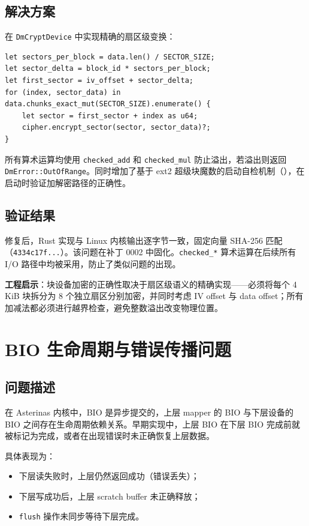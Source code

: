 \subsection{解决方案}

在 \texttt{DmCryptDevice} 中实现精确的扇区级变换：

\begin{verbatim}
let sectors_per_block = data.len() / SECTOR_SIZE;
let sector_delta = block_id * sectors_per_block;
let first_sector = iv_offset + sector_delta;
for (index, sector_data) in data.chunks_exact_mut(SECTOR_SIZE).enumerate() {
    let sector = first_sector + index as u64;
    cipher.encrypt_sector(sector, sector_data)?;
}
\end{verbatim}

所有算术运算均使用 \texttt{checked\_add} 和 \texttt{checked\_mul} 防止溢出，若溢出则返回 \texttt{DmError::OutOfRange}。同时增加了基于 ext2 超级块魔数的启动自检机制（\texttt{}），在启动时验证加解密路径的正确性。

\subsection{验证结果}

修复后，Rust 实现与 Linux 内核输出逐字节一致，固定向量 SHA-256 匹配（\texttt{4334c17f...}）。该问题在补丁 0002 中固化。\texttt{checked\_*} 算术运算在后续所有 I/O 路径中均被采用，防止了类似问题的出现。

\textbf{工程启示}：块设备加密的正确性取决于扇区级语义的精确实现——必须将每个 4 KiB 块拆分为 8 个独立扇区分别加密，并同时考虑 IV offset 与 data offset；所有加减法都必须进行越界检查，避免整数溢出改变物理位置。

\section{BIO 生命周期与错误传播问题}

\subsection{问题描述}

在 Asterinas 内核中，BIO 是异步提交的，上层 mapper 的 BIO 与下层设备的 BIO 之间存在生命周期依赖关系。早期实现中，上层 BIO 在下层 BIO 完成前就被标记为完成，或者在出现错误时未正确恢复上层数据。

具体表现为：
\begin{itemize}
    \item 下层读失败时，上层仍然返回成功（错误丢失）；
    \item 下层写成功后，上层 scratch buffer 未正确释放；
    \item \texttt{flush} 操作未同步等待下层完成。
\end{itemize}

